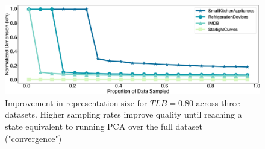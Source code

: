 \begin{figure}
\includegraphics[width=\linewidth]{figs/progressive.pdf}
\caption[]{ Improvement in representation size for  $TLB = 0.80$ across three datasets. Higher sampling rates improve quality until reaching a state equivalent to running PCA over the full dataset ("convergence")}
\label{fig:progressive}
\end{figure}




